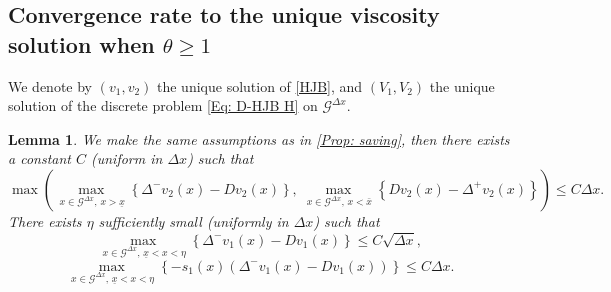 \documentclass[11pt]{article}
\numberwithin{equation}{section}
\numberwithin{algorithm}{section}
\newtheorem{lemma}[lemma]{Lemma}
\newcommand{\lc}{\left(}
\newcommand{\rc}{\right)}
\newcommand{\ux}{{\underline x}}
\newcommand{\beq}{\begin{equation}}
\newcommand{\eeq}{\end{equation}}
\theoremstyle{plain}
\newcommand{\D}{\Delta}
\begin{document}
\subsection{Convergence rate to the unique viscosity solution when $\theta \geq 1$}\label{Subsec: rate}
We denote by $(v_1,v_2)$ the unique solution of \cref{HJB}, and $(V_1,V_2)$ the unique solution of the discrete problem \cref{Eq: D-HJB H} on $ \mathcal{G}^{\D x}$.
\begin{lemma}\label{Lemma: error FD}
We make the same assumptions as in \cref{Prop: saving}, then there exists a constant $C$ (uniform in $\D x$) such that
\beq\label{Eq: FD erro v2}
\max\lc\max_{\,x\in \mathcal{G}^{\D x},\,x>\ux}\left\{\D^-{v_{2}(x)}-Dv_{2}(x)\right\},\,\max_{\,x\in \mathcal{G}^{\D x},\,x<\bar{x}}\left\{Dv_{2}(x)-\D^+{v_{2}(x)}\right\}\rc\leq C\D x.
\eeq
There exists $\eta$ sufficiently small (uniformly in $\D x$) such that
\beq\label{Eq: FD boundDx}
\max_{\,x\in \mathcal{G}^{\D x},\,\ux<x<\eta}\left\{\D^-{v_{1}(x)}-Dv_{1}(x)\right\}\leq C\sqrt{\D x},
\eeq
\beq\label{Eq: s1FD boundDx}
\max_{\,x\in \mathcal{G}^{\D x},\,\ux<x<\eta}\left\{-s_1(x)\lc\D^-{v_{1}(x)}-Dv_{1}(x)\rc\right\}\leq C\D x.
\eeq
\end{lemma}
\end{document}
